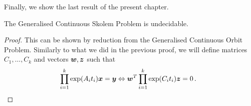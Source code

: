 Finally, we show the last result of the present chapter.

\begin{theorem}
The Generalised Continuous Skolem Problem is undecidable.
\end{theorem}

\begin{proof}
This can be shown by reduction from the Generalised Continuous Orbit Problem.
Similarly to what we did in the previous proof, we will define matrices $C_{1}, \ldots, C_{k}$ and vectors $\boldsymbol{w}, \boldsymbol{z}$ such that
\begin{equation*}
\prod \limits_{i=1}^{k} \exp(A_{i} t_{i}) \boldsymbol{x} = \boldsymbol{y}
\Leftrightarrow
\boldsymbol{w}^{T} \prod\limits_{i=1}^{k} \exp(C_{i} t_{i}) \boldsymbol{z} = 0 \, .
\end{equation*}


\end{proof}
